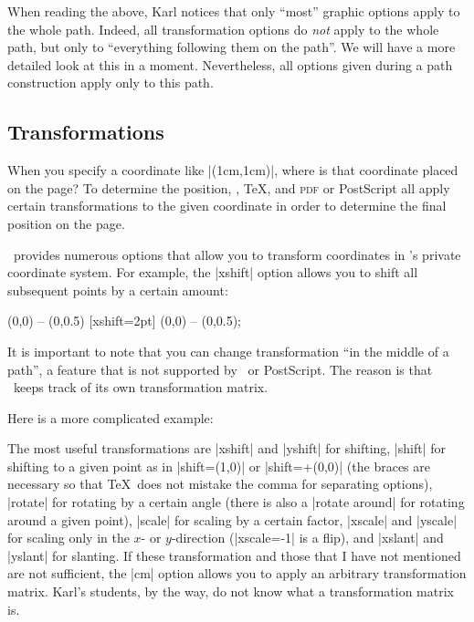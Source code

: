 When reading the above, Karl notices that only ``most'' graphic options apply
to the whole path. Indeed, all transformation options do \emph{not} apply to
the whole path, but only to ``everything following them on the path''. We will
have a more detailed look at this in a moment. Nevertheless, all options given
during a path construction apply only to this path.


\subsection{Transformations}

When you specify a  coordinate like |(1cm,1cm)|, where is that coordinate
placed on the page? To determine the position, \tikzname, \TeX, and
\textsc{pdf} or PostScript all apply certain transformations to the given
coordinate in order to determine the final position on the page.

\tikzname\ provides numerous options that allow you to transform coordinates in
\tikzname's private coordinate system. For example, the |xshift| option allows
you to shift all subsequent points by a certain amount:

\begin{codeexample}[]
\tikz \draw (0,0) -- (0,0.5) [xshift=2pt] (0,0) -- (0,0.5);
\end{codeexample}

It is important to note that you can change transformation ``in the middle of a
path'', a feature that is not supported by \pdf\ or PostScript. The reason is
that \tikzname\ keeps track of its own transformation matrix.

Here is a more complicated example:
%
\begin{codeexample}[]
\end{codeexample}

The most useful transformations are |xshift| and |yshift| for shifting, |shift|
for shifting to a given point as in |shift={(1,0)}| or |shift={+(0,0)}| (the
braces are necessary so that \TeX\ does not mistake the comma for separating
options), |rotate| for rotating by a certain angle (there is also a
|rotate around| for rotating around a given point), |scale| for scaling by a
certain factor, |xscale| and |yscale| for scaling only in the $x$- or
$y$-direction (|xscale=-1| is a flip), and |xslant| and |yslant| for slanting.
If these transformation and those that I have not mentioned are not sufficient,
the |cm| option allows you to apply an arbitrary transformation matrix. Karl's
students, by the way, do not know what a transformation matrix is.


